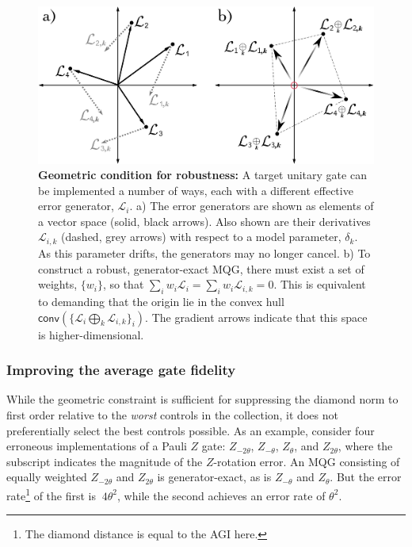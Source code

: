 \documentclass[aps,nofootinbib,pra,notitlepage,twocolumn]{revtex4-1}
\newcommand{\genmat}{\ensuremath{{\mathcal{L}}}}
\newcommand{\0}{\ensuremath{\mathbf{0}}}
\newcommand{\weight}{\ensuremath{w}}
\begin{document}
\begin{figure}
  \centering
  \includegraphics[width=\columnwidth]{vectorspace3.png}
  \caption{\textbf{Geometric condition for robustness:}   A target unitary gate can be implemented a number of ways, each with a different effective error generator, $\genmat_i$. a) The error generators are shown as elements of a vector space (solid, black arrows). Also shown are their derivatives $\genmat_{i,k}$ (dashed, grey arrows) with respect to a model parameter, $\delta_k$. As this parameter drifts, the generators may no longer cancel. b) To construct a robust, generator-exact MQG, there must exist a set of weights, $\{\weight_i\}$, so that $\sum_i \weight_i \genmat_i = \sum_i \weight_i \genmat_{i,k} = 0$. This is equivalent to demanding that the origin lie in the convex hull $\mathsf{conv}(\{\genmat_i \bigoplus_k \genmat_{i,k} \}_i)$. The gradient arrows indicate that this space is higher-dimensional. }
  \label{fig:vectorspace2}
\end{figure}


\subsubsection{Improving the average gate fidelity}
\label{sec:norm}
\noindent While the geometric constraint is sufficient for suppressing the diamond norm to first order relative to the \textit{worst} controls in the collection, it does not preferentially select the best controls possible.  As an example, consider four erroneous implementations of a Pauli $Z$ gate: $Z_{-2\theta}$, $Z_{-\theta}$, $Z_{\theta}$, and $Z_{2\theta}$, where the subscript indicates the magnitude of the $Z$-rotation error. An MQG consisting of equally weighted $Z_{-2\theta}$ and $Z_{2\theta}$ is generator-exact, as is $Z_{-\theta}$ and $Z_{\theta}$. But the error rate\footnote{The diamond distance is equal to the AGI here.} of the first is $~4\theta^2$, while the second achieves an error rate of $\theta^2$. 
\end{document}
